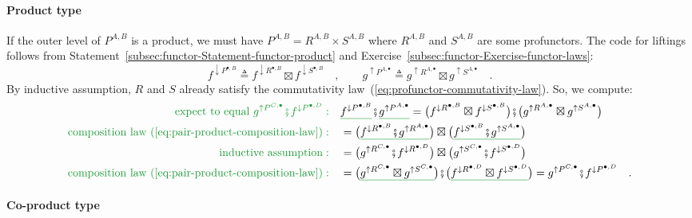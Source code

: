 \paragraph{Product type}

If the outer level of $P^{A,B}$ is a product, we must have $P^{A,B}=R^{A,B}\times S^{A,B}$
where $R^{A,B}$ and $S^{A,B}$ are some profunctors. The code for
liftings follows from Statement~\ref{subsec:functor-Statement-functor-product}
and Exercise~\ref{subsec:functor-Exercise-functor-laws}:
\[
f^{\downarrow P^{\bullet,B}}\triangleq f^{\downarrow R^{\bullet,B}}\boxtimes f^{\downarrow S^{\bullet,B}}\quad,\quad\quad g^{\uparrow P^{A,\bullet}}\triangleq g^{\uparrow R^{A,\bullet}}\boxtimes g^{\uparrow S^{A,\bullet}}\quad.
\]
By inductive assumption, $R$ and $S$ already satisfy the commutativity
law~(\ref{eq:profunctor-commutativity-law}). So, we compute:
\begin{align*}
{\color{greenunder}\text{expect to equal }g^{\uparrow P^{C,\bullet}}\bef f^{\downarrow P^{\bullet,D}}:}\quad & \gunderline{f^{\downarrow P^{\bullet,B}}}\bef\gunderline{g^{\uparrow P^{A,\bullet}}}=\big(f^{\downarrow R^{\bullet,B}}\boxtimes f^{\downarrow S^{\bullet,B}}\big)\bef\big(g^{\uparrow R^{A,\bullet}}\boxtimes g^{\uparrow S^{A,\bullet}}\big)\\
{\color{greenunder}\text{composition law~(\ref{eq:pair-product-composition-law})}:}\quad & =\big(\gunderline{f^{\downarrow R^{\bullet,B}}\bef g^{\uparrow R^{A,\bullet}}}\big)\boxtimes\big(\gunderline{f^{\downarrow S^{\bullet,B}}\bef g^{\uparrow S^{A,\bullet}}}\big)\\
{\color{greenunder}\text{inductive assumption}:}\quad & =\big(g^{\uparrow R^{C,\bullet}}\bef f^{\downarrow R^{\bullet,D}}\big)\boxtimes\big(g^{\uparrow S^{C,\bullet}}\bef f^{\downarrow S^{\bullet,D}}\big)\\
{\color{greenunder}\text{composition law~(\ref{eq:pair-product-composition-law})}:}\quad & =\big(\gunderline{g^{\uparrow R^{C,\bullet}}\boxtimes g^{\uparrow S^{C,\bullet}}}\big)\bef\big(\gunderline{f^{\downarrow R^{\bullet,D}}\boxtimes f^{\downarrow S^{\bullet,D}}}\big)=g^{\uparrow P^{C,\bullet}}\bef f^{\downarrow P^{\bullet,D}}\quad.
\end{align*}


\paragraph{Co-product type}

